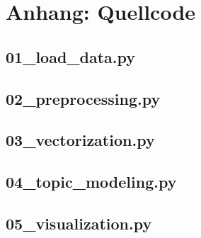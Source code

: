 \documentclass[a4paper,11pt]{article}
\begin{document}
\newpage
\appendix
\section*{Anhang: Quellcode}

\subsection*{01\_load\_data.py}


\subsection*{02\_preprocessing.py}


\subsection*{03\_vectorization.py}


\subsection*{04\_topic\_modeling.py}


\subsection*{05\_visualization.py}

\end{document}
